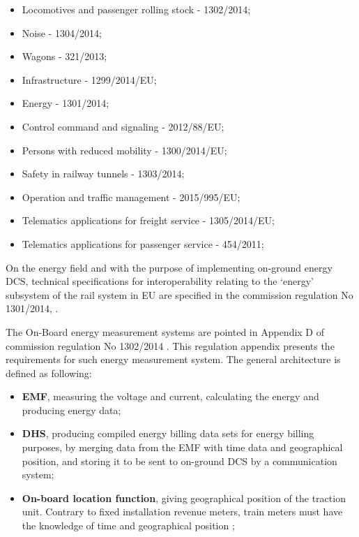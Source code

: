 \begin{itemize}
	\setlength\itemsep{-0.5em}
	\item Locomotives and passenger rolling stock - 1302/2014;
	\item Noise - 1304/2014;
	\item Wagons - 321/2013;
	\item Infrastructure - 1299/2014/EU;
	\item Energy - 1301/2014;
	\item Control command and signaling - 2012/88/EU;
	\item Persons with reduced mobility - 1300/2014/EU;
	\item Safety in railway tunnels - 1303/2014;
	\item Operation and traffic management - 2015/995/EU;
	\item Telematics applications for freight service - 1305/2014/EU;
	\item Telematics applications for passenger service - 454/2011;
		
\end{itemize}


On the energy field and with the purpose of implementing on-ground energy \ac{DCS}, technical specifications for interoperability relating to the ‘energy’ subsystem of the rail system in \ac{EU} are specified in the commission regulation No 1301/2014, \cite{eur-lex2014}. 



The On-Board energy measurement systems are pointed in Appendix D of commission regulation No 1302/2014 \cite{eur-lex2014b}. This regulation appendix presents the requirements for such energy measurement system. The general architecture is defined as following:

\begin{itemize}
	\setlength\itemsep{-0.5em}
	\item \textbf{ \ac{EMF}}, measuring the voltage and current, calculating the energy and producing energy data;
	\item \textbf{ \ac{DHS}}, producing compiled energy billing data sets for energy billing purposes, by merging data from the EMF with time data and geographical position, and storing it to be sent to on-ground \ac{DCS} by a communication system;
	\item \textbf{On-board location function}, giving geographical position of the traction unit. Contrary to fixed installation revenue meters, train meters must have the knowledge of time and geographical position \cite{metas2015};
\end{itemize}

